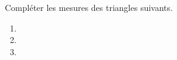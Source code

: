 
\begin{exercice}\label{exosmath-0842}

    Compléter les mesures des triangles suivants.

    \begin{multicols}{2}
        \begin{enumerate}
            \item
   
   \item
   
   \item
   
        \end{enumerate}
    \end{multicols}

\end{exercice}
